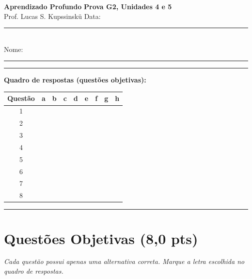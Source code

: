 \documentclass[11pt,a4paper]{article}
\begin{document}
{\Large\bfseries Aprendizado Profundo} \hfill \textbf{Prova G2, Unidades 4 e 5}\\
Prof. Lucas S. Kupssinskü \hfill Data: \rule{3cm}{0.4pt}\\[0.4em]
Nome: \rule{12cm}{0.4pt}

\rule{\linewidth}{0.8pt}

\textbf{Quadro de respostas (questões objetivas):}\\[0.3em]
\begin{center}
\begin{tabular}{|c|c|c|c|c|c|c|c|c|}
\hline
\textbf{Questão} & \textbf{a} & \textbf{b} & \textbf{c} & \textbf{d} & \textbf{e} & \textbf{f} & \textbf{g} & \textbf{h} \\\hline
1 & & & & & & & & \\\hline
2 & & & & & & & & \\\hline
3 & & & & & & & & \\\hline
4 & & & & & & & & \\\hline
5 & & & & & & & & \\\hline
6 & & & & & & & & \\\hline
7 & & & & & & & & \\\hline
8 & & & & & & & & \\\hline
\end{tabular}
\end{center}

\rule{\linewidth}{0.4pt}

\section*{Questões Objetivas (8{,}0 pts)}
\textit{Cada questão possui apenas uma alternativa correta. Marque a letra escolhida no quadro de respostas.}
\end{document}
